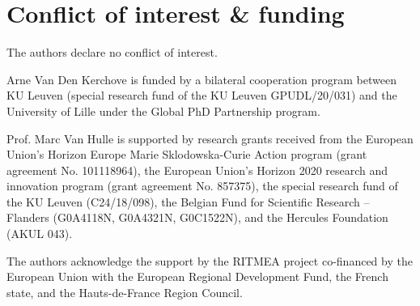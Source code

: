 \chapter*{Conflict of interest \& funding}
The authors declare no conflict of interest.

Arne Van Den Kerchove is funded by a bilateral cooperation program between KU
Leuven (special research fund of the KU Leuven GPUDL/20/031) and the University
of Lille under the Global PhD Partnership program.

Prof. Marc Van Hulle is supported by research grants received from
the European Union’s Horizon Europe Marie Sklodowska-Curie Action program
(grant agreement No. 101118964), the European Union’s Horizon 2020 research and
innovation program (grant agreement No. 857375), the special research fund of
the KU Leuven (C24/18/098), the Belgian Fund for Scientific Research – Flanders
(G0A4118N, G0A4321N, G0C1522N), and the Hercules
Foundation (AKUL 043).

The authors acknowledge the support by the RITMEA project co-fi\-nan\-ced by the
European Union with the European Regional Development Fund, the French state,
and the Hauts-de-France Region Council.
